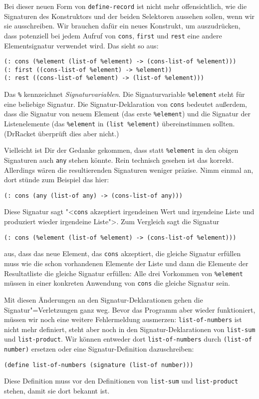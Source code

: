 Bei dieser neuen Form von \lstinline{define-record} ist
nicht mehr offensichtlich, wie die Signaturen des Konstruktors und der
beiden Selektoren aussehen sollen, wenn wir sie ausschreiben.  Wir
brauchen dafür ein neues Konstrukt, um auszudrücken, dass potenziell
bei jedem Aufruf von \lstinline{cons}, \lstinline{first} und
\lstinline{rest} eine andere Elementsignatur verwendet wird.  Das
sieht so aus:
%
\begin{lstlisting}
(: cons (%element (list-of %element) -> (cons-list-of %element)))
(: first ((cons-list-of %element) -> %element))
(: rest ((cons-list-of %element) -> (list-of %element)))
\end{lstlisting}
%
Das \verb|%| kennzeichnet
\textit{Signaturvariablen}.  Die
Signaturvariable \lstinline{%element} steht für eine beliebige
Signatur.  Die Signatur-Deklaration von \lstinline{cons} bedeutet
außerdem, dass die Signatur von neuem Element (das erste \lstinline{%element})
und die Signatur der Listenelemente (das \lstinline{%element} in 
\lstinline{(list %element)} übereinstimmen sollten.  (DrRacket
  überprüft dies aber nicht.)

Vielleicht ist Dir der Gedanke gekommen, dass statt
\lstinline{%element} in den obigen Signaturen auch \lstinline{any}
stehen könnte.  Rein technisch gesehen ist das korrekt.  Allerdings
wären die resultierenden Signaturen weniger präzise.  Nimm einmal
an, dort stünde zum Beispiel das hier:
%
\begin{lstlisting}
(: cons (any (list-of any) -> (cons-list-of any)))
\end{lstlisting}
%
Diese Signatur sagt "<\lstinline{cons} akzeptiert irgendeinen Wert und
irgendeine Liste und produziert wieder irgendeine Liste">.  Zum
Vergleich sagt die Signatur
%
\begin{lstlisting}
(: cons (%element (list-of %element) -> (cons-list-of %element)))
\end{lstlisting}
%
aus, dass das neue Element, das \lstinline{cons} akzeptiert, die
gleiche Signatur erfüllen muss wie die schon vorhandenen Elemente der
Liste und dann die Elemente der Resultatliste die gleiche Signatur
erfüllen: Alle drei Vorkommen von \lstinline{%element} müssen in einer
konkreten Anwendung von \lstinline{cons} die gleiche Signatur sein.

Mit diesen Änderungen an den Signatur-Deklarationen gehen die
Signatur"=Verletzungen ganz weg.  Bevor das Programm aber wieder
funktioniert, müssen wir noch eine weitere Fehlermeldung
ausmerzen: \lstinline{list-of-numbers} ist nicht mehr
definiert, steht aber noch in den Signatur-Deklarationen von
\lstinline{list-sum} und \lstinline{list-product}.  Wir können
entweder dort \lstinline{list-of-numbers} durch \lstinline{(list-of number)}
ersetzen oder eine Signatur-Definition
dazuschreiben:
%
\begin{lstlisting}
(define list-of-numbers (signature (list-of number)))
\end{lstlisting}
%
Diese Definition muss vor den Definitionen von \lstinline{list-sum}
und \lstinline{list-product} stehen, damit sie dort bekannt ist.

